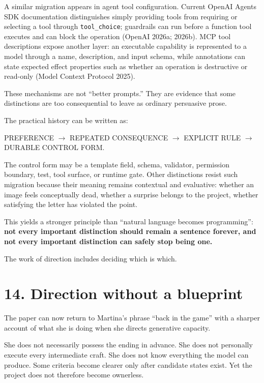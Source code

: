 \documentclass[
  11pt,
  letterpaper,
]{article}
\begin{document}
A similar migration appears in agent tool configuration. Current OpenAI
Agents SDK documentation distinguishes simply providing tools from
requiring or selecting a tool through \texttt{tool\_choice}; guardrails
can run before a function tool executes and can block the operation
(OpenAI 2026a; 2026b). MCP tool descriptions expose another layer: an
executable capability is represented to a model through a name,
description, and input schema, while annotations can state expected
effect properties such as whether an operation is destructive or
read-only (Model Context Protocol 2025).

These mechanisms are not ``better prompts.'' They are evidence that some
distinctions are too consequential to leave as ordinary persuasive
prose.

The practical history can be written as:

\begin{center}
PREFERENCE $\rightarrow$ REPEATED CONSEQUENCE $\rightarrow$ EXPLICIT RULE $\rightarrow$ DURABLE CONTROL FORM.
\end{center}

The control form may be a template field, schema, validator, permission
boundary, test, tool surface, or runtime gate. Other distinctions resist
such migration because their meaning remains contextual and evaluative:
whether an image feels conceptually dead, whether a surprise belongs to
the project, whether satisfying the letter has violated the point.

This yields a stronger principle than ``natural language becomes
programming'': \textbf{not every important distinction should remain a
sentence forever, and not every important distinction can safely stop
being one.}

The work of direction includes deciding which is which.

\section{14. Direction without a
blueprint}\label{direction-without-a-blueprint}

The paper can now return to Martina's phrase ``back in the game'' with a
sharper account of what she is doing when she directs generative
capacity.

She does not necessarily possess the ending in advance. She does not
personally execute every intermediate craft. She does not know
everything the model can produce. Some criteria become clearer only
after candidate states exist. Yet the project does not therefore become
ownerless.
\end{document}
